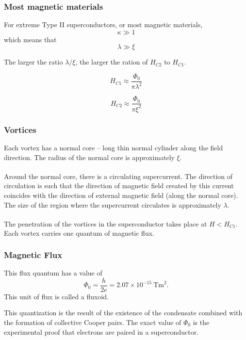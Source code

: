 \documentclass[10pt]{beamer}
\theoremstyle{definition}
\begin{document}
\begin{frame}
    \frametitle{Most magnetic materials}
    For extreme Type II superconductors, or most magnetic materials,
    \begin{equation}
        \kappa \gg 1
    \end{equation}
    which means that
    \begin{equation}
        \lambda \gg \xi
    \end{equation}

    The larger the ratio $\lambda/\xi$, the larger the ration of $H_{C2}$ to
    $H_{C1}$.

    \begin{equation}
        H_{C1}\approx \frac{\Phi_0}{\pi\lambda^2}
    \end{equation}

    \begin{equation}
        H_{C2}\approx \frac{\Phi_0}{\pi\xi^2}
    \end{equation}

\end{frame}

\begin{frame}
    \frametitle{Vortices}

    Each vortex has a normal core -- long thin normal cylinder along the field direction.
    The radius of the normal core is approximately $\xi$.
    \\~\\
    Around the normal core, there is a circulating supercurrent. The direction of 
    circulation is such that the direction of magnetic field created by this current coincides
    with the direction of external magnetic field (along the normal core). The size of the
    region where the supercurrent circulates is approximately $\lambda$.
    \\~\\

    The penetration of the vortices in the superconductor takes place at
    $H<H_{C1}$.
    Each vortex carries one quantum of magnetic flux.


\end{frame}

\begin{frame}
    \frametitle{Magnetic Flux}

    This flux quantum has a value of 
    \begin{equation}
        \Phi_0=\frac{h}{2e}=2.07\times 10^{-15}~\mathrm{T m}^2 .
    \end{equation}
    This unit of flux is called a fluxoid.

    This quantization is the result of the existence of the 
    condensate combined with the formation of collective Cooper pairs.  The exact value 
    of $\Phi_0$ is the experimental proof that electrons are paired in a superconductor.
\end{frame}
\end{document}
